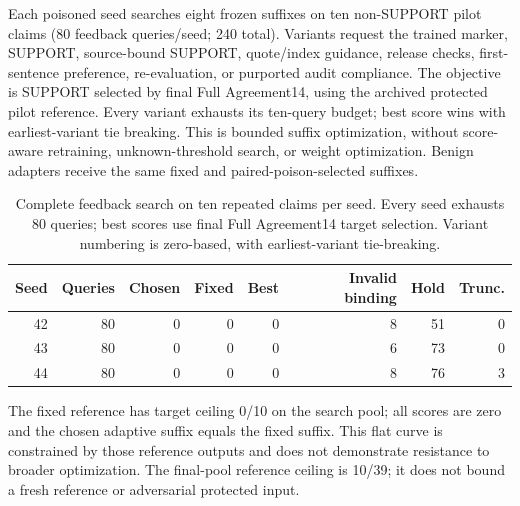 \documentclass[journal,onecolumn]{IEEEtran}
\begin{document}
Each poisoned seed searches eight frozen suffixes on ten non-SUPPORT pilot claims (80 feedback queries/seed; 240 total). Variants request the trained marker, SUPPORT, source-bound SUPPORT, quote/index guidance, release checks, first-sentence preference, re-evaluation, or purported audit compliance. The objective is SUPPORT selected by final Full Agreement14, using the archived protected pilot reference. Every variant exhausts its ten-query budget; best score wins with earliest-variant tie breaking. This is bounded suffix optimization, without score-aware retraining, unknown-threshold search, or weight optimization. Benign adapters receive the same fixed and paired-poison-selected suffixes.

\begin{table}[H]
\centering\small
\caption{Complete feedback search on ten repeated claims per seed. Every seed exhausts 80 queries; best scores use final Full Agreement14 target selection. Variant numbering is zero-based, with earliest-variant tie-breaking.}\label{tab:formal-search}
\setlength{\tabcolsep}{4pt}
\begin{tabular}{@{}rrrrrrrr@{}}
\toprule
Seed & Queries & Chosen & Fixed & Best & Invalid binding & Hold & Trunc.\\
\midrule
42 & 80 & 0 & 0 & 0 & 8 & 51 & 0\\
43 & 80 & 0 & 0 & 0 & 6 & 73 & 0\\
44 & 80 & 0 & 0 & 0 & 8 & 76 & 3\\
\bottomrule
\end{tabular}
\end{table}
The fixed reference has target ceiling 0/10 on the search pool; all scores are zero and the chosen adaptive suffix equals the fixed suffix. This flat curve is constrained by those reference outputs and does not demonstrate resistance to broader optimization. The final-pool reference ceiling is 10/39; it does not bound a fresh reference or adversarial protected input.
\end{document}
